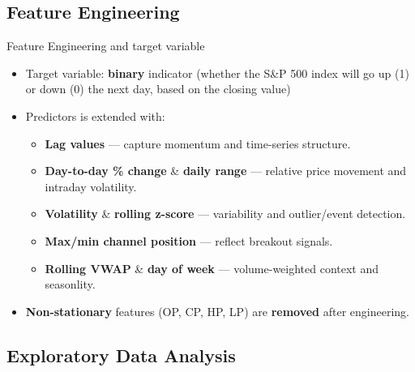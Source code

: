 \documentclass[aspectratio=43]{beamer} %
\begin{document}
\subsection{Feature Engineering}
\begin{frame}{Feature Engineering and target variable}
\begin{itemize}
  \item Target variable: \textbf{binary} indicator (whether the S\&P 500 index will go up (1) or down (0) the next day, based on the closing value)
  \item Predictors is extended with:
  \begin{itemize}
    \item \textbf{Lag values} --- capture momentum and time-series structure.
    \item \textbf{Day-to-day \% change} \& \textbf{daily range} --- relative price movement and intraday volatility.
    \item \textbf{Volatility} \& \textbf{rolling z-score} --- variability and outlier/event detection.
    \item \textbf{Max/min channel position} --- reflect breakout signals.
    \item \textbf{Rolling VWAP} \& \textbf{day of week} --- volume-weighted context and seasonlity.
  \end{itemize}
  \item \textbf{Non-stationary} features (OP, CP, HP, LP) are \textbf{removed} after engineering.
\end{itemize}
\end{frame}

\subsection{Exploratory Data Analysis}

\end{document}
